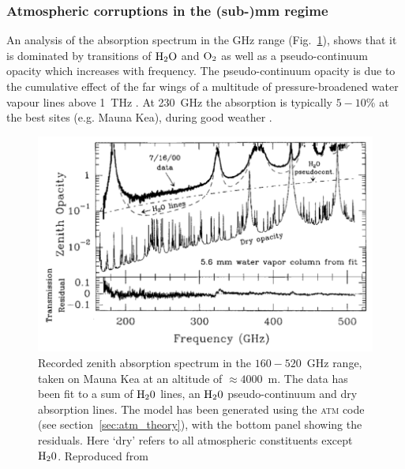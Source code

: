 \subsubsection{Atmospheric corruptions in the (sub-)mm regime}
An analysis of the absorption spectrum in the GHz range (Fig.~\ref{fig:absorption}), shows that it is dominated by transitions of $\rm H_2O$ and $\rm O_2$ as well as a pseudo-continuum opacity which increases with frequency. The pseudo-continuum opacity is due to the cumulative effect of the far wings of a multitude of pressure-broadened water vapour lines above 1~THz \citep{Carilli_1999}. At 230~GHz the absorption is typically $5-10$\% at the best sites (e.g. Mauna Kea), during good weather . 

\begin{figure}
\begin{center}
\includegraphics[width=\columnwidth]{Images/absorption}
\caption{Recorded zenith absorption spectrum in the $160-520$~GHz range, taken on Mauna Kea at an altitude of $\approx 4000$~m. The data has been fit to a sum of $\rm H_20$ lines, an $\rm H_20$ pseudo-continuum and dry absorption lines. The model has been generated using the \textsc{atm} code (see section~\ref{sec:atm_theory}), with the bottom panel showing the residuals. Here `dry' refers to all atmospheric constituents except $\rm H_20$. Reproduced from \citet{Pardo_2001} \label{fig:absorption}
}
\end{center}
\end{figure}

